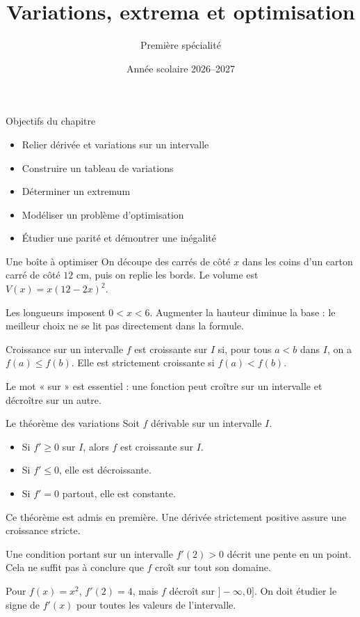 \documentclass[aspectratio=169,12pt]{beamer}
\title{Variations, extrema et optimisation}
\subtitle{Première spécialité}
\date{Année scolaire 2026--2027}
\begin{document}
\begin{frame}\titlepage\end{frame}
\begin{frame}{Objectifs du chapitre}\begin{itemize}
\item Relier dérivée et variations sur un intervalle
\item Construire un tableau de variations
\item Déterminer un extremum
\item Modéliser un problème d’optimisation
\item Étudier une parité et démontrer une inégalité
\end{itemize}\end{frame}
\renewcommand{\slidekind}{COMPRENDRE}
\begin{frame}[t,fragile]{Une boîte à optimiser}
On découpe des carrés de côté $x$ dans les coins d’un carton carré de côté $12$ cm, puis on replie les bords. Le volume est $V(x)=x(12-2x)^2$.\medskip\par Les longueurs imposent $0<x<6$. Augmenter la hauteur diminue la base : le meilleur choix ne se lit pas directement dans la formule.
\end{frame}
\renewcommand{\slidekind}{COMPRENDRE}
\begin{frame}[t,fragile]{Croissance sur un intervalle}
$f$ est croissante sur $I$ si, pour tous $a<b$ dans $I$, on a $f(a)\le f(b)$. Elle est strictement croissante si $f(a)<f(b)$.\medskip\par Le mot « sur » est essentiel : une fonction peut croître sur un intervalle et décroître sur un autre.
\end{frame}
\renewcommand{\slidekind}{COMPRENDRE}
\begin{frame}[t,fragile]{Le théorème des variations}
Soit $f$ dérivable sur un intervalle $I$.\begin{itemize}\item Si $f\prime\ge0$ sur $I$, alors $f$ est croissante sur $I$.\item Si $f\prime\le0$, elle est décroissante.\item Si $f\prime=0$ partout, elle est constante.\end{itemize} Ce théorème est admis en première. Une dérivée strictement positive assure une croissance stricte.
\end{frame}
\renewcommand{\slidekind}{COMPRENDRE}
\begin{frame}[t,fragile]{Une condition portant sur un intervalle}
$f\prime(2)>0$ décrit une pente en un point. Cela ne suffit pas à conclure que $f$ croît sur tout son domaine.\medskip\par Pour $f(x)=x^2$, $f\prime(2)=4$, mais $f$ décroît sur $]-\infty,0]$. On doit étudier le signe de $f\prime(x)$ pour toutes les valeurs de l’intervalle.
\end{frame}
\end{document}
